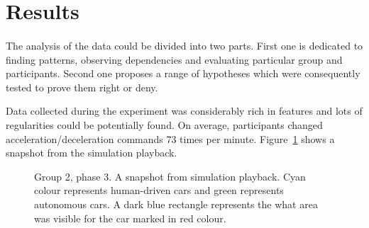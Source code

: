 \documentclass[11pt,english]{article}
\begin{document}
\section{Results}

\paragraph{}

The analysis of the data could be divided into two parts. First one is dedicated to finding patterns, observing dependencies and evaluating particular group and participants. Second one proposes a range of hypotheses which were consequently tested to prove them right or deny. %

\par

Data collected during the experiment was considerably rich in features and lots of regularities could be potentially found. On average, participants changed acceleration/deceleration commands 73 times per minute. 
Figure~\ref{fig:sample_snapshot} shows a snapshot from the simulation playback.  
 
 
\begin{figure}[h] %
\caption{Group 2, phase 3. A snapshot from simulation playback. Cyan colour represents human-driven cars and green represents autonomous cars. A dark blue rectangle represents the what area was visible for the car marked in red colour.}
\label{fig:sample_snapshot}
\end{figure} 
 
\end{document}
